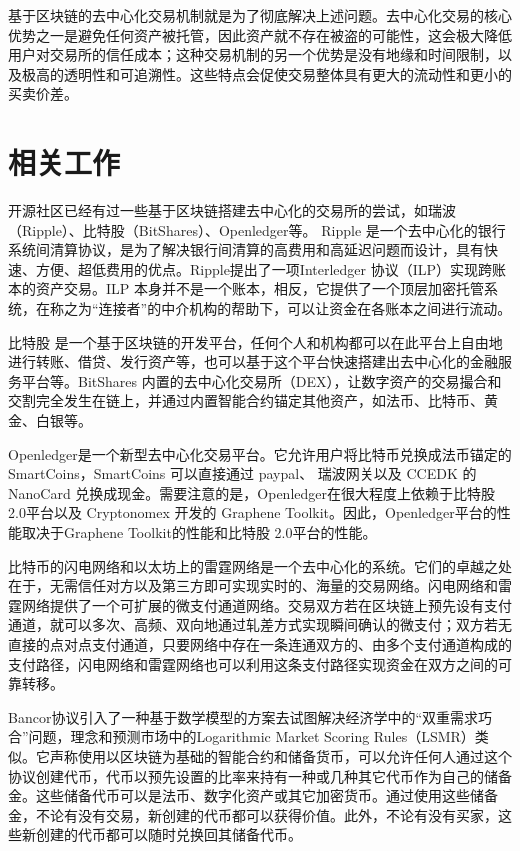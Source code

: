 \documentclass[UTF8,nofonts]{ctexart}
\begin{document}
基于区块链的去中心化交易机制就是为了彻底解决上述问题。去中心化交易的核心优势之一是避免任何资产被托管，因此资产就不存在被盗的可能性，这会极大降低用户对交易所的信任成本；这种交易机制的另一个优势是没有地缘和时间限制，以及极高的透明性和可追溯性。这些特点会促使交易整体具有更大的流动性和更小的买卖价差。

\section{相关工作\label{sec:existingworks}}

开源社区已经有过一些基于区块链搭建去中心化的交易所的尝试，如瑞波（Ripple）、比特股（BitShares）、Openledger等。
Ripple \cite{schwartz2014ripple} 是一个去中心化的银行系统间清算协议，是为了解决银行间清算的高费用和高延迟问题而设计，具有快速、方便、超低费用的优点。Ripple提出了一项Interledger \cite{thomas2015protocol} 协议（ILP）实现跨账本的资产交易。ILP 本身并不是一个账本，相反，它提供了一个顶层加密托管系统，在称之为“连接者”的中介机构的帮助下，可以让资金在各账本之间进行流动。

比特股 \cite{schuhbitshares}\cite{schuh2015bitshares}  是一个基于区块链的开发平台，任何个人和机构都可以在此平台上自由地进行转账、借贷、发行资产等，也可以基于这个平台快速搭建出去中心化的金融服务平台等。BitShares 内置的去中心化交易所（DEX），让数字资产的交易撮合和交割完全发生在链上，并通过内置智能合约锚定其他资产，如法币、比特币、黄金、白银等。

Openledger是一个新型去中心化交易平台。它允许用户将比特币兑换成法币锚定的 SmartCoins，SmartCoins 可以直接通过 paypal、 瑞波网关以及 CCEDK 的 NanoCard 兑换成现金。需要注意的是，Openledger在很大程度上依赖于比特股 2.0平台以及 Cryptonomex 开发的 Graphene Toolkit。因此，Openledger平台的性能取决于Graphene Toolkit的性能和比特股 2.0平台的性能。

比特币的闪电网络和以太坊上的雷霆网络\cite{poon2015bitcoin}是一个去中心化的系统。它们的卓越之处在于，无需信任对方以及第三方即可实现实时的、海量的交易网络。闪电网络和雷霆网络提供了一个可扩展的微支付通道网络。交易双方若在区块链上预先设有支付通道，就可以多次、高频、双向地通过轧差方式实现瞬间确认的微支付；双方若无直接的点对点支付通道，只要网络中存在一条连通双方的、由多个支付通道构成的支付路径，闪电网络和雷霆网络也可以利用这条支付路径实现资金在双方之间的可靠转移。


Bancor协议引入了一种基于数学模型的方案去试图解决经济学中的“双重需求巧合”问题，理念和预测市场中的Logarithmic Market Scoring Rules（LSMR）类似。它声称使用以区块链为基础的智能合约和储备货币，可以允许任何人通过这个协议创建代币，代币以预先设置的比率来持有一种或几种其它代币作为自己的储备金。这些储备代币可以是法币、数字化资产或其它加密货币。通过使用这些储备金，不论有没有交易，新创建的代币都可以获得价值。此外，不论有没有买家，这些新创建的代币都可以随时兑换回其储备代币。
\end{document}
